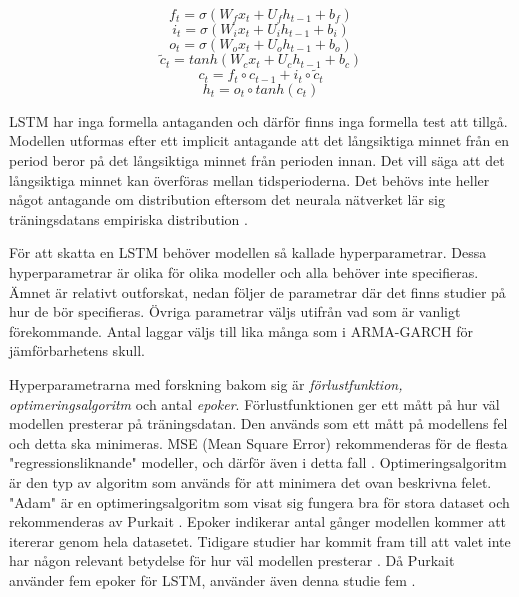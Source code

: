 \documentclass[11pt]{article}
\numberwithin{equation}{section}
\numberwithin{table}{section}
\numberwithin{figure}{section}
\begin{document}
\begin{equation}f_t = \sigma(W_f x_t + U_f h_{t-1} + b_f)\end{equation}
\begin{equation}i_t = \sigma(W_i x_t + U_i h_{t-1} + b_i)\end{equation}
\begin{equation}o_t = \sigma(W_o x_t + U_o h_{t-1} + b_o)\end{equation}
\begin{equation}\tilde{c}_t = tanh(W_c x_t + U_c h_{t-1} + b_c)\end{equation}
\begin{equation}c_t= f_t \circ c_{t-1} + i_t \circ \tilde{c}_t\end{equation}
\begin{equation}h_t= o_t \circ tanh(c_t)\end{equation}

LSTM har inga formella antaganden och därför finns inga formella test att tillgå. Modellen utformas efter ett implicit antagande att det långsiktiga minnet från en period beror på det långsiktiga minnet från perioden innan. Det vill säga att det långsiktiga minnet kan överföras mellan tidsperioderna. Det behövs inte heller något antagande om distribution eftersom det neurala nätverket lär sig träningsdatans empiriska distribution \parencite[][,s.478-559]{purkait2019hands}.

För att skatta en LSTM behöver modellen så kallade hyperparametrar. Dessa hyperparametrar är olika för olika modeller och alla behöver inte specifieras. Ämnet är relativt outforskat, nedan följer de parametrar där det finns studier på hur de bör specifieras. Övriga parametrar väljs utifrån vad som är vanligt förekommande. Antal laggar väljs till lika många som i ARMA-GARCH för jämförbarhetens skull.

Hyperparametrarna med forskning bakom sig är \textit{förlustfunktion, optimeringsalgoritm} och antal \textit{epoker}. Förlustfunktionen ger ett mått på hur väl modellen presterar på träningsdatan. Den används som ett mått på modellens fel och detta ska minimeras. MSE (Mean Square Error) rekommenderas för de flesta "regressionsliknande" modeller, och därför även i detta fall \parencite[][,s.178 ff.]{purkait2019hands}. Optimeringsalgoritm är den typ av algoritm som används för att minimera det ovan beskrivna felet. "Adam" är en optimeringsalgoritm som visat sig fungera bra för stora dataset och rekommenderas av Purkait \parencite*[][,s.178 ff.]{purkait2019hands}. Epoker indikerar antal gånger modellen kommer att itererar genom hela datasetet. Tidigare studier har kommit fram till att valet inte har någon relevant betydelse för hur väl modellen presterar \parencite{siaminamini2018forecasting}. Då Purkait använder fem epoker för LSTM, använder även denna studie fem \parencite[][,s.178 ff.]{purkait2019hands}.
\end{document}
